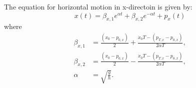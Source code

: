 \documentclass{article}
\begin{document}
The equation for horizontal motion in x-directoin is given by:
\begin{equation}
x(t) = \beta_{x, 1} e^{\alpha t} + \beta_{x, 2} e^{-\alpha t} + p_x(t)
\end{equation}
where
\begin{align*}
    \beta_{x, 1} &= \frac{(x_0 - p_{0, x})}{2} + \frac{\dot{x}_0 T - (p_{T, x} - p_{0, x})}{2 \alpha T}, \\
    \beta_{x, 2} &= \frac{(x_0 - p_{0, x})}{2} - \frac{\dot{x}_0 T - (p_{T, x} - p_{0, x})}{2 \alpha T}, \\
    \alpha &= \sqrt{\frac{g}{h}}.
\end{align*}
\end{document}
